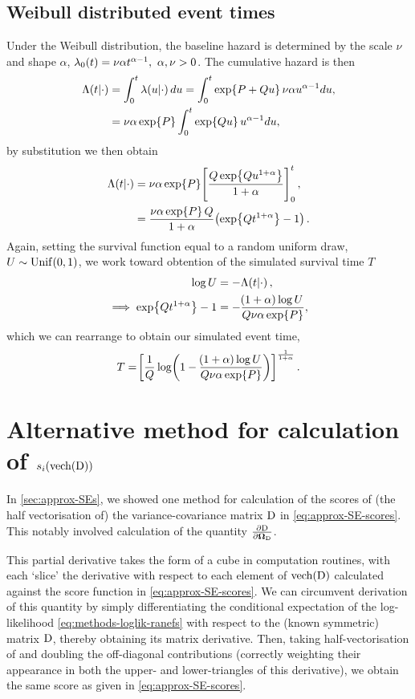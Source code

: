 \subsection*{Weibull distributed event times}
Under the Weibull distribution, the baseline hazard is determined by the scale $\nu$ and shape $\alpha$, $\lo(t)=\nu\alpha t^{\alpha-1},\ \alpha,\nu>0$. The cumulative hazard is then
\begin{align*}
    \Lambda\!\left( t|\cdot\right)&=\int_0^t\lambda\!\left( u|\cdot\right) du=\int_0^t\exp\!\left\{ P + Qu\right\}\nu\alpha u^{\alpha-1}du,\\
    &=\nu\alpha\exp\!\left\{ P \right\}\int_0^t\exp\!\left\{ Qu\right\} u^{\alpha-1}du,
\end{align*}
by substitution we then obtain \citep{Austin2012}
\begin{align*}
    \Lambda\!\left( t|\cdot\right)&=\nu\alpha\exp\!\left\{ P\right\}\!\left[\frac{Q\exp\!\left\{ Qu^{1+\alpha}\right\}}{1+\alpha}\right]_0^t,\\
    &=\frac{\nu\alpha\exp\!\left\{ P\right\} Q}{1+\alpha}\!\left(\exp\!\left\{ Qt^{1+\alpha}\right\}-1\right).
\end{align*}
Again, setting the survival function equal to a random uniform draw, $U\sim \mathrm{Unif}\!\left( 0, 1\right)$, we work toward obtention of the simulated survival time $T$
\begin{align*}
    \log U &= -\Lambda\!\left( t|\cdot\right),\\
    \implies\exp\!\left\{ Qt^{1+\alpha}\right\}-1&=-\frac{\!\left( 1 + \alpha\right) \log U}{Q\nu\alpha\exp\!\left\{ P \right\}},
\end{align*}
which we can rearrange to obtain our simulated event time,
\begin{equation}
    T=\!\left[\frac{1}{Q}\log\!\left(1-\frac{\!\left(1+\alpha\right)\log U}{Q\nu\alpha\exp\!\left\{ P\right\}}\right)\right]^{\frac{1}{1+\alpha}}.
\end{equation}

\section{Alternative method for calculation of \texorpdfstring{$s_i\!\left(\text{vech}\!\left(\mathrm{D}\right)\right)$}{Dscore}}\label{sec:appendix-alt-Dscore}
In \ref{sec:approx-SEs}, we showed one method for calculation of the scores of (the half vectorisation of) the variance-covariance matrix $\mathrm{D}$ in \eqref{eq:approx-SE-scores}. This notably involved calculation of the quantity $\frac{\partial\mathrm{D}}{\partial\bm{\mathrm{\Omega}}_{\mathrm{D}}}$. 

This partial derivative takes the form of a cube in computation routines, with each `slice' the derivative with respect to each element of $\text{vech}\!\left(\mathrm{D}\right)$ calculated against the score function in \eqref{eq:approx-SE-scores}. We can circumvent derivation of this quantity by simply differentiating the conditional expectation of the log-likelihood \eqref{eq:methods-loglik-ranefs} with respect to the (known symmetric) matrix $\mathrm{D}$, thereby obtaining its matrix derivative. Then, taking half-vectorisation of and doubling the off-diagonal contributions (correctly weighting their appearance in both the upper- and lower-triangles of this derivative), we obtain the same score as given in \eqref{eq:approx-SE-scores}.

